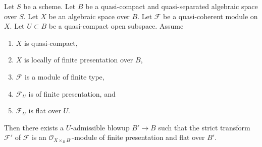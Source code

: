 \begin{theorem}
\label{theorem-flatten-module}
Let $S$ be a scheme. Let $B$ be a quasi-compact and quasi-separated
algebraic space over $S$. Let $X$ be an algebraic space over $B$.
Let $\mathcal{F}$ be a quasi-coherent module on $X$.
Let $U \subset B$ be a quasi-compact open subspace. Assume
\begin{enumerate}
\item $X$ is quasi-compact,
\item $X$ is locally of finite presentation over $B$,
\item $\mathcal{F}$ is a module of finite type,
\item $\mathcal{F}_U$ is of finite presentation, and
\item $\mathcal{F}_U$ is flat over $U$.
\end{enumerate}
Then there exists a $U$-admissible blowup $B' \to B$ such that the
strict transform $\mathcal{F}'$ of $\mathcal{F}$ is an
$\mathcal{O}_{X \times_B B'}$-module of finite presentation and
flat over $B'$.
\end{theorem}

